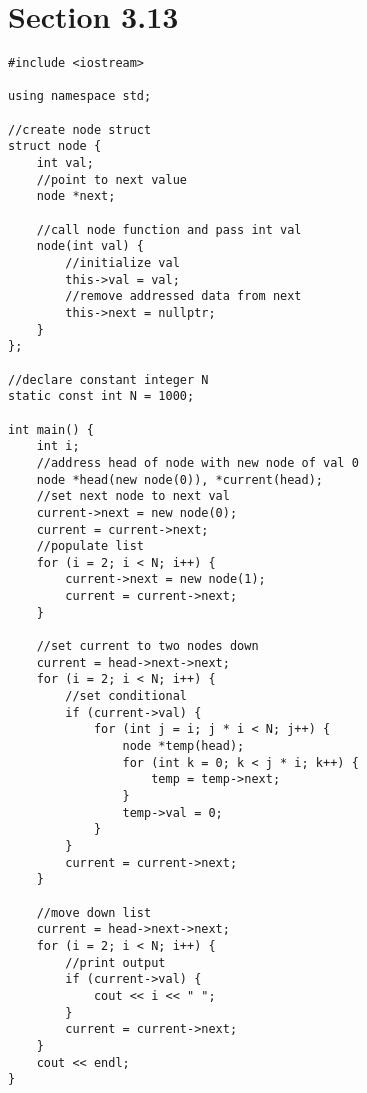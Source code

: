 \documentclass[11pt]{article}
\begin{document}
\section{Section 3.13}
\begin{lstlisting}
#include <iostream>

using namespace std;

//create node struct
struct node {
    int val;
    //point to next value
    node *next;

    //call node function and pass int val
    node(int val) {
        //initialize val
        this->val = val;
        //remove addressed data from next
        this->next = nullptr;
    }
};

//declare constant integer N
static const int N = 1000;

int main() {
    int i;
    //address head of node with new node of val 0
    node *head(new node(0)), *current(head);
    //set next node to next val
    current->next = new node(0);
    current = current->next;
    //populate list
    for (i = 2; i < N; i++) {
        current->next = new node(1);
        current = current->next;
    }

    //set current to two nodes down
    current = head->next->next;
    for (i = 2; i < N; i++) {
        //set conditional
        if (current->val) {
            for (int j = i; j * i < N; j++) {
                node *temp(head);
                for (int k = 0; k < j * i; k++) {
                    temp = temp->next;
                }
                temp->val = 0;
            }
        }
        current = current->next;
    }

    //move down list
    current = head->next->next;
    for (i = 2; i < N; i++) {
        //print output
        if (current->val) {
            cout << i << " ";
        }
        current = current->next;
    }
    cout << endl;
}
\end{lstlisting}
\end{document}
